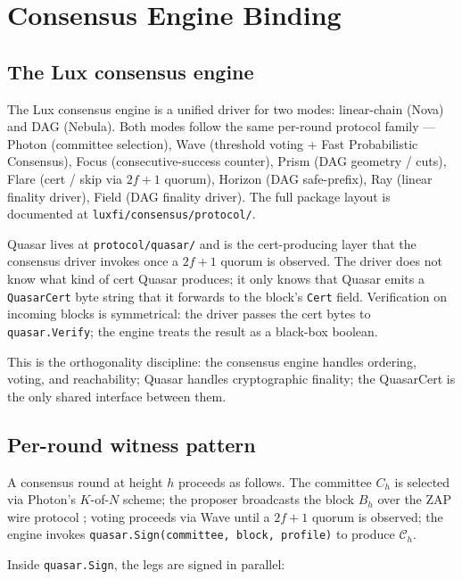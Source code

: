 \section{Consensus Engine Binding}
\label{sec:binding}

\subsection{The Lux consensus engine}

The Lux consensus engine \cite{consensusrepo} is a unified driver for
two modes: linear-chain (Nova) and DAG (Nebula). Both modes follow
the same per-round protocol family --- Photon (committee selection),
Wave (threshold voting + Fast Probabilistic Consensus), Focus
(consecutive-success counter), Prism (DAG geometry / cuts), Flare
(cert / skip via $2f+1$ quorum), Horizon (DAG safe-prefix), Ray
(linear finality driver), Field (DAG finality driver). The full
package layout is documented at \texttt{luxfi/consensus/protocol/}.

Quasar lives at \texttt{protocol/quasar/} and is the cert-producing
layer that the consensus driver invokes once a $2f+1$ quorum is
observed. The driver does not know what kind of cert Quasar produces;
it only knows that Quasar emits a \texttt{QuasarCert} byte string
that it forwards to the block's \texttt{Cert} field. Verification on
incoming blocks is symmetrical: the driver passes the cert bytes to
\texttt{quasar.Verify}; the engine treats the result as a black-box
boolean.

This is the orthogonality discipline: the consensus engine handles
ordering, voting, and reachability; Quasar handles cryptographic
finality; the QuasarCert is the only shared interface between them.

\subsection{Per-round witness pattern}

A consensus round at height $h$ proceeds as follows. The committee
$C_h$ is selected via Photon's $K$-of-$N$ scheme; the proposer
broadcasts the block $B_h$ over the ZAP wire protocol
\cite{lp020}; voting proceeds via Wave until a $2f+1$ quorum is
observed; the engine invokes
\texttt{quasar.Sign(committee, block, profile)} to produce
$\mathcal{C}_h$.

Inside \texttt{quasar.Sign}, the legs are signed in parallel:

